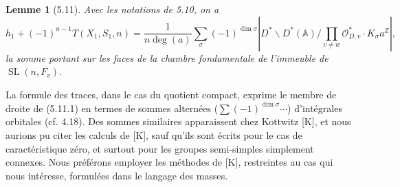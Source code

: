 \documentclass[10pt]{article}
\newcommand{\Z}{\mathbb Z}
\newcommand{\Adele}{\mathbb A}
\newcommand{\SL}{\operatorname{SL}}
\newcommand{\degm}{\operatorname{deg}}
\theoremstyle{deligne}
\newtheorem*{lemma*}{Lemme}
\begin{document}
\begin{lemma*}[5.11]
Avec les notations de 5.10, on a
\begin{equation}\tag{5.11.1}
h_1+(-1)^{n-1}T(X_1,S_1,n)
=\frac{1}{n\degm(a)}\sum_\sigma(-1)^{\dim\sigma}
\left|D^*\backslash D^*(\Adele)/\prod_{v\ne w}\mathcal O_{D,v}^*\cdot K_\sigma a^\Z\right|,
\end{equation}
la somme portant sur les faces de la chambre fondamentale de l'immeuble de $\SL(n,F_v)$.
\end{lemma*}

La formule des traces, dans le cas du quotient compact, exprime le membre de droite de (5.11.1) en termes de sommes alternées ($\sum(-1)^{\dim\sigma}\cdots$) d'intégrales orbitales (cf. 4.18). Des sommes similaires apparaissent chez Kottwitz [K], et nous aurions pu citer les calculs de [K], sauf qu'ils sont écrits pour le cas de caractéristique zéro, et surtout pour les groupes semi-simples simplement connexes. Nous préférons employer les méthodes de [K], restreintes au cas qui nous intéresse, formulées dans le langage des masses.
\end{document}
